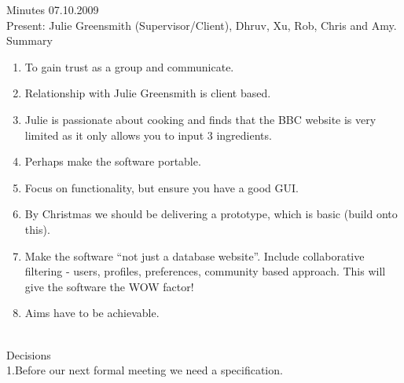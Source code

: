 Minutes 07.10.2009 \\

Present: Julie Greensmith (Supervisor/Client), Dhruv, Xu, Rob,
Chris and Amy. \\

Summary \\

\begin{enumerate}
\item
  To gain trust as a group and communicate.
\item
  Relationship with Julie Greensmith is client based.
\item
  Julie is passionate about cooking and finds that the BBC website is
  very limited as it only allows you to input 3 ingredients.
\item
  Perhaps make the software portable.
\item
  Focus on functionality, but ensure you have a good GUI.
\item
  By Christmas we should be delivering a prototype, which is basic
  (build onto this).
\item
  Make the software “not just a database website”. Include
  collaborative filtering - users, profiles, preferences, community
  based approach. This will give the software the WOW factor!
\item
  Aims have to be achievable.
\end{enumerate}
\\
Decisions \\

1.Before our next formal meeting we need a specification.


